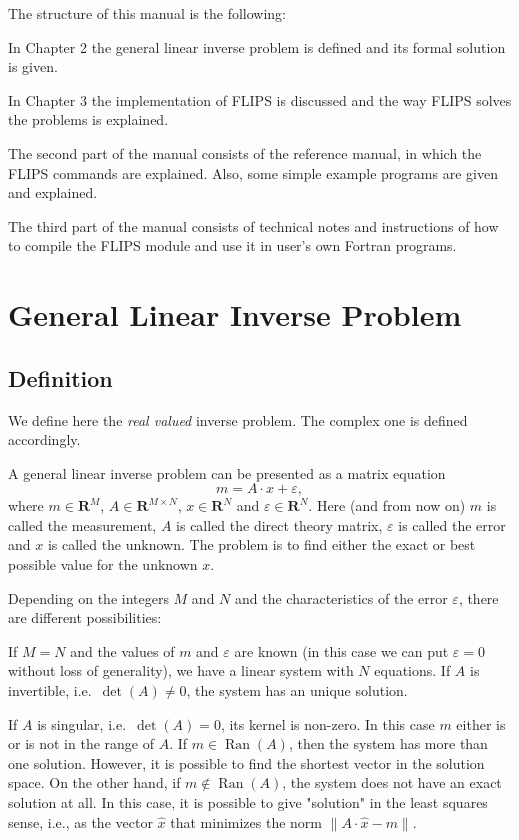 \documentclass[a4paper,twoside]{refrep}
\newcommand{\ve}{\varepsilon}
\newcommand{\Ran}{\operatorname{Ran}}
\begin{document}
The structure of this manual is the following:

In Chapter 2 the general linear inverse problem is defined and its formal solution is given.

In Chapter 3 the implementation of FLIPS is discussed and the way FLIPS solves the problems is explained.

The second part of the manual consists of the reference manual, in which the FLIPS commands are explained. Also, some simple example programs are given and explained.

The third part of the manual consists of technical notes and instructions of how to compile the FLIPS module and use it in user's own Fortran programs.


\chapter{General Linear Inverse Problem}\label{glip}

\section{Definition}\label{glipdef}

We define here the \emph{real valued} inverse problem. The complex one is defined accordingly.

A general linear inverse problem can be presented as a matrix equation
\begin{equation}\label{genprob}
m = A\cdot x + \varepsilon,
\end{equation}
where $m\in{\mathbf R}^M$, $A\in{\mathbf R}^{M\times N}$, $x\in{\mathbf R}^N$ and $\varepsilon\in{\mathbf R}^N$. Here (and from now on) $m$ is called the measurement, $A$ is called the direct theory matrix, $\varepsilon$ is called the error and $x$ is called the unknown. The problem is to find either the exact or best possible value for the unknown $x$.

Depending on the integers $M$ and $N$ and the characteristics of the error $\varepsilon$, there are different possibilities:

If $M=N$ and the values of $m$ and $\ve$ are known (in this case we can put $\ve=0$ without loss of generality), we have a linear system with $N$ equations. If $A$ is invertible, i.e.\ $\det(A)\neq0$, the system has an unique solution.

If $A$ is singular, i.e.\ $\det(A)=0$, its kernel is non-zero. In this case $m$ either is or is not in the range of $A$. If $m\in\Ran(A)$, then the system has more than one solution. However, it is possible to find the shortest vector in the solution space. On the other hand, if $m\not\in\Ran(A)$, the system does not have an exact solution at all. In this case, it is possible to give "solution" in the least squares sense, i.e., as the vector $\hat{x}$ that minimizes the norm $\|A\cdot\hat{x}-m\|$.
\end{document}
